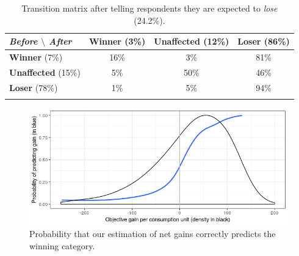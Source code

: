 \documentclass[11pt]{article}
\begin{document}
\begin{appendices}
\vspace{1cm}

\begin{table}[H]
\caption[table]{Transition matrix after telling respondents they are expected to \textit{lose} (24.2\%).}
{\label{table:transition_matrix_negative_feedback}}
\centering
\begin{tabular}{lccc}
\textit{Before $\setminus$ After} & \textbf{Winner} (3\%) & \textbf{Unaffected} (12\%) & \textbf{Loser} (86\%) \\
\hline
\textbf{Winner} (7\%) & 16\% & 3\% & 81\% \\
\textbf{Unaffected} (15\%) & 5\% & 50\% & 46\% \\
\textbf{Loser} (78\%) & 1\% & 5\% & 94\% \\ \\
\end{tabular}
\end{table}

\vspace{1.5cm}


\begin{figure}[H]
\centering
\includegraphics[width=0.8\columnwidth]{Images/proba_correct_prediction.png}
\caption{Probability that our estimation of net gains correctly predicts the winning category.}
\label{fig:proba_pred}
\end{figure}


\end{appendices}
\end{document}
